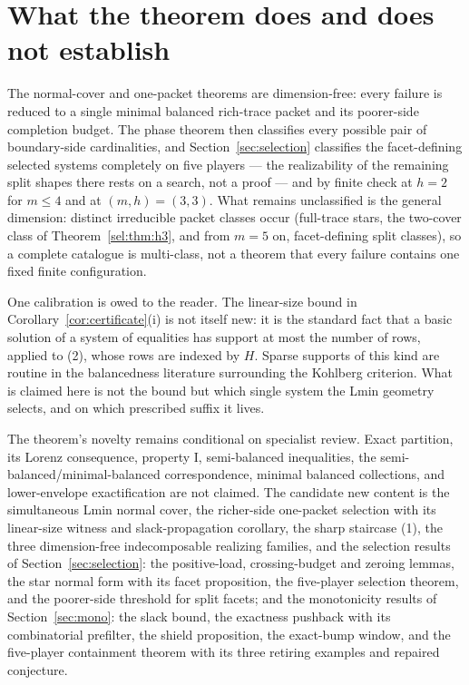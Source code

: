 \documentclass[11pt]{article}
\begin{document}
\section{What the theorem does and does not establish}\label{sec:limits}

The normal-cover and one-packet theorems are dimension-free: every failure is
reduced to a single minimal balanced rich-trace packet and its poorer-side
completion budget.  The phase theorem then classifies every possible pair of
boundary-side cardinalities, and Section~\ref{sec:selection} classifies
the facet-defining selected systems completely on five players --- the
realizability of the remaining split shapes there rests on a search, not a
proof --- and by finite check at $h=2$ for $m\le4$ and at $(m,h)=(3,3)$.  What remains unclassified is the general
dimension: distinct irreducible packet classes occur (full-trace stars, the
two-cover class of Theorem~\ref{sel:thm:h3}, and from $m=5$ on, facet-defining
split classes), so a complete catalogue is multi-class, not a theorem that
every failure contains one fixed finite configuration.

One calibration is owed to the reader.  The linear-size bound in
Corollary~\ref{cor:certificate}(i) is not itself new: it is the standard fact
that a basic solution of a system of equalities has support at most the
number of rows, applied to (2), whose rows are indexed by $H$.  Sparse
supports of this kind are routine in the balancedness literature surrounding
the Kohlberg criterion.  What is claimed here is not the bound but which
single system the Lmin geometry selects, and on which prescribed suffix it
lives.

The theorem's novelty remains conditional on specialist review.  Exact
partition, its Lorenz consequence, property I, semi-balanced inequalities,
the semi-balanced/minimal-balanced correspondence, minimal balanced
collections, and lower-envelope exactification are not claimed.  The
candidate new content is the simultaneous Lmin normal cover, the richer-side
one-packet selection with its linear-size witness and slack-propagation
corollary, the sharp staircase (1), the three dimension-free
indecomposable realizing families, and the selection results of
Section~\ref{sec:selection}: the positive-load, crossing-budget and zeroing
lemmas, the star normal form with its facet proposition, the five-player
selection theorem, and the poorer-side threshold for split facets; and the
monotonicity results of Section~\ref{sec:mono}: the slack bound, the
exactness pushback with its combinatorial prefilter, the shield proposition,
the exact-bump window, and the five-player containment theorem with its
three retiring examples and repaired conjecture.
\end{document}
